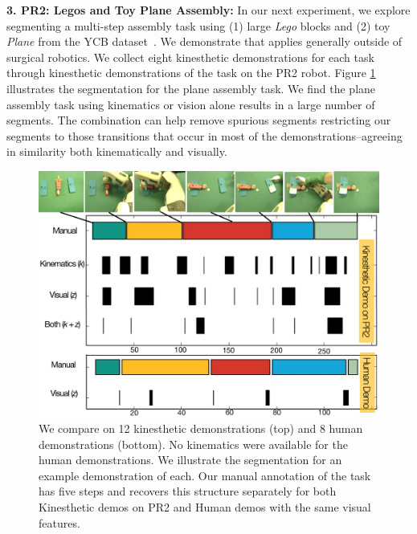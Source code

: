 \vspace{5pt}
\noindent \textbf{3. PR2: Legos and Toy Plane Assembly: }
In our next experiment, we explore segmenting a multi-step assembly task using (1) large \textit{Lego} blocks and (2) toy \textit{Plane} from the YCB dataset~\cite{calli2015corr}. 
We demonstrate that \tsc applies generally outside of surgical robotics.
We collect eight kinesthetic demonstrations for each task through kinesthetic demonstrations of the task on the PR2 robot.
Figure \ref{pr2toyplane} illustrates the segmentation for the plane assembly task.
We find the plane assembly task using kinematics or vision alone results in a large number of segments.
The combination can help remove spurious segments restricting our segments to those transitions that occur in most of the demonstrations--agreeing in similarity both kinematically and visually.


\begin{figure}[!t]
\centering
\includegraphics[width=\linewidth]{tsc-experiments/pr2_plane_assembly-v5}
\caption{We compare \tsc on 12 kinesthetic demonstrations (top) and
8 human demonstrations (bottom).
No kinematics were available for the human demonstrations.
We illustrate the segmentation for an example demonstration of each.
Our manual annotation of the task has five steps and \tsc recovers this structure separately for both Kinesthetic demos on PR2 and Human demos with the same visual features. \label{pr2toyplane}}
\end{figure}


